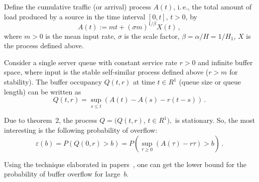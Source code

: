 \begin{multicols}{2}
\noindent
Define the cumulative traffic (or arrival) process $A(t)$, i.\,e.,
the total amount of load produced 
by a source in the time interval $[0,t]$, $t>0$, by 
$$
A(t) := mt + (\sigma m)^{1/\beta} X(t) \,, 
$$
where $m>0$ is the mean input rate, $\sigma$ is the scale factor, 
$\beta = \alpha/H = 1/H_1$, $X$ is the process defined above. 


Consider a single server queue with constant service rate $r>0$ and infinite buffer 
space, where input is the stable self-similar process defined above 
($r>m$ for stability). The buffer occupancy 
$Q(t,r)$ at time $t\in R^1$ (queue size or queue length) can be written as 
$$
Q(t,r) = \sup\limits_{s\leq t} (A(t) - A(s) - r (t-s)) \,.
$$

\smallskip

Due to theorem~2, the process $Q = (Q(t,r)$, $t$\linebreak $\in R^1),$ is stationary. 
So, the most 
interesting is the following probability of overflow: 
$$
\varepsilon (b) = P(Q(0, r) > b) = P\left(\sup\limits_{\tau \geq 0} 
\left(A(\tau ) - r \tau \right) >b \right) \,.
$$

Using the technique elaborated in papers~\cite{1-nik, 13-nik}, one can get the lower bound for 
the probability of buffer overflow for large~$b$. 


\end{multicols}
